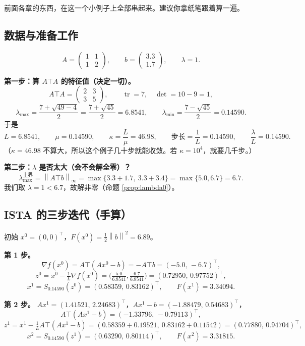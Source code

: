 \documentclass[11pt,a4paper,UTF8]{ctexart}
\theoremstyle{plain}
\theoremstyle{definition}
\theoremstyle{remark}
\newcommand{\norm}[1]{\left\lVert #1 \right\rVert}
\newcommand{\tr}{\operatorname{tr}}
\newcommand{\tp}{^{\top}}
\begin{document}
前面各章的东西，在这一个小例子上全部串起来。建议你拿纸笔跟着算一遍。

\subsection{数据与准备工作}

\[
A=\begin{pmatrix}1&1\\1&2\end{pmatrix},\qquad b=\begin{pmatrix}3.3\\1.7\end{pmatrix},\qquad
\lambda=1 .
\]

\textbf{第一步：算 $A\top A$ 的特征值（决定一切）。}
\[
A\top A=\begin{pmatrix}2&3\\3&5\end{pmatrix},\qquad
\tr=7,\quad \det=10-9=1,
\]
\[
\lambda_{\max}=\frac{7+\sqrt{49-4}}{2}=\frac{7+\sqrt{45}}{2}=6.8541,\qquad
\lambda_{\min}=\frac{7-\sqrt{45}}{2}=0.14590 .
\]
于是
\[
L=6.8541,\qquad \mu=0.14590,\qquad \kappa=\frac L\mu=46.98,\qquad
\text{步长}=\frac1L=0.14590,\qquad \frac{\lambda}{L}=0.14590 .
\]
（$\kappa=46.98$ 不算大，所以这个例子几十步就能收敛。若 $\kappa=10^4$，就要几千步。）

\textbf{第二步：$\lambda$ 是否太大（会不会解全零）？}
\[
\lambda_{\max}^{\text{上界}}=\norm{A\top b}_\infty=\max\{3.3+1.7,\ 3.3+3.4\}=\max\{5.0,6.7\}=6.7 .
\]
我们取 $\lambda=1<6.7$，故解非零（命题 \ref{prop:lambda0}）。

\subsection{ISTA 的三步迭代（手算）}

初始 $x^0=(0,0)\tp$，$F(x^0)=\tfrac12\norm b^2=6.89$。

\textbf{第 1 步。}
\[
\nabla f(x^0)=A\top(Ax^0-b)=-A\top b=(-5.0,\,-6.7)\tp ,
\]
\[
z^0=x^0-\tfrac1L\nabla f(x^0)=\bigl(\tfrac{5.0}{6.8541},\tfrac{6.7}{6.8541}\bigr)=(0.72950,\,0.97752)\tp ,
\]
\[
x^1=S_{0.14590}(z^0)=(0.58359,\,0.83162)\tp,\qquad F(x^1)=3.34094 .
\]

\textbf{第 2 步。} $Ax^1=(1.41521,\,2.24683)\tp$，$Ax^1-b=(-1.88479,\,0.54683)\tp$，
\[
A\top(Ax^1-b)=(-1.33796,\,-0.79113)\tp,
\]
\[
z^1=x^1-\tfrac1L A\top(Ax^1-b)=(0.58359+0.19521,\ 0.83162+0.11542)=(0.77880,\,0.94704)\tp,
\]
\[
x^2=S_{0.14590}(z^1)=(0.63290,\,0.80114)\tp,\qquad F(x^2)=3.31815 .
\]
\end{document}
